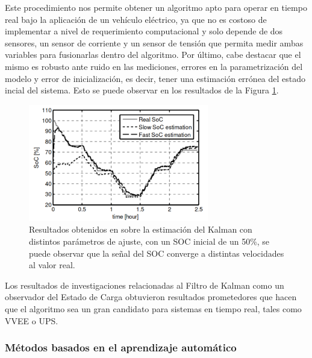 \documentclass[10pt,a4paper]{article}
\begin{document}
\noindent Este procedimiento nos permite obtener un algoritmo apto para operar
en tiempo real bajo la aplicaci\'on de un veh\'iculo el\'ectrico, ya que no es
costoso de implementar a nivel de requerimiento computacional y solo depende de
dos sensores, un sensor de corriente y un sensor de tensi\'on que permita medir
ambas variables para fusionarlas dentro del algoritmo. Por \'ultimo, cabe
destacar que el mismo es robusto ante ruido en las mediciones, errores en la
parametrizaci\'on del modelo y error de inicializaci\'on, es decir, tener una
estimaci\'on err\'onea del estado incial del sistema. Esto se puede observar en
los resultados de la Figura \ref{resultados_soc_spagnoli}.

\begin{figure}[h!]
    \begin{center}
        \includegraphics[width=0.7\textwidth]{soc_results_spagnoli.png}
        \caption{Resultados obtenidos en \cite{spagnol_kalman} sobre la
        estimaci\'on del Kalman con distintos par\'ametros de ajuste, con un
        \acrshort{SOC} inicial de un 50\%, se puede observar que la señal del
        \acrshort{SOC} converge a distintas velocidades al valor real.}
        \label{resultados_soc_spagnoli}
    \end{center}
\end{figure}

\noindent Los resultados de investigaciones relacionadas al Filtro de Kalman
como un observador del Estado de Carga obtuvieron resultados prometedores que
hacen que el algoritmo sea un gran candidato para sistemas en tiempo real, tales
como \acrshort{VVEE} o \acrshort{UPS}.

\subsubsection{M\'etodos basados en el aprendizaje autom\'atico}
\end{document}
